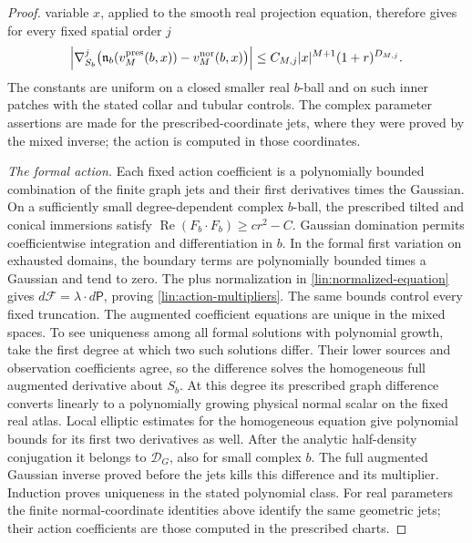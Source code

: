 \begin{proof}
variable $x$, applied to the smooth real projection equation, therefore
gives for every fixed spatial order $j$
\begin{equation}\label{lin:normal-conversion-remainder}
 \left|\nabla_{S_b}^j\bigl(\mathfrak n_b(v_M^{\rm pres}(b,x))
                   -v_M^{\rm nor}(b,x)\bigr)\right|
 \le C_{M,j}|x|^{M+1}(1+r)^{D_{M,j}}.
\end{equation}
The constants are uniform on a closed smaller real $b$-ball and on such
inner patches with the stated collar and tubular controls.  The complex parameter
assertions are made for the prescribed-coordinate jets, where they were
proved by the mixed inverse; the action is computed in those coordinates.

\emph{The formal action.}
Each fixed action coefficient is a polynomially bounded combination
of the finite graph jets and their first derivatives times the Gaussian.
On a sufficiently small degree-dependent complex $b$-ball, the prescribed
tilted and conical immersions satisfy
$\operatorname{Re}(F_b\cdot F_b)\ge c r^2-C$.
Gaussian domination permits coefficientwise integration and differentiation
in $b$.  In the formal first variation on exhausted domains, the boundary
terms are polynomially bounded times a Gaussian and tend to zero.
The plus normalization in \eqref{lin:normalized-equation} gives
$d\mathcal F=\lambda\cdot d\mathsf P$, proving
\eqref{lin:action-multipliers}.  The same bounds control every fixed
truncation.  The augmented coefficient equations are unique in the
mixed spaces.  To see uniqueness among all formal solutions with polynomial
growth, take the first degree at which two such solutions differ.  Their
lower sources and observation coefficients agree, so the difference solves
the homogeneous full augmented derivative about $S_b$.  At this degree
its prescribed graph difference converts linearly to a polynomially growing
physical normal scalar on the fixed real atlas.  Local elliptic estimates
for the homogeneous equation give polynomial bounds for its first two
derivatives as well.  After the analytic half-density conjugation it
belongs to $\mathcal D_G$, also for small complex $b$.  The full augmented
Gaussian inverse proved before the jets kills this difference and its
multiplier.  Induction proves uniqueness in the stated polynomial class.
For real parameters the finite normal-coordinate identities above identify
the same geometric jets; their action coefficients are those computed in
the prescribed charts.
\end{proof}

